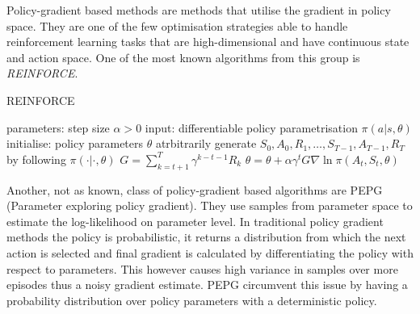 Policy-gradient based methods are methods that utilise the gradient in policy space. They are one  of the few optimisation strategies able to handle reinforcement learning tasks that are high-dimensional and have continuous state and action space. One of the most known algorithms from this group is \emph{REINFORCE}\cite{Sutton1998}.
\begin{algorithm}[h]
    \begin{algorithmic}[1]
    \caption{REINFORCE}
    \label{alg:reinforce}
        \State parameters: step size $\alpha>0$ 
        \State input: differentiable policy parametrisation $\pi(a|s,\theta)$
        \State initialise: policy parameters $\theta$ atrbitrarily
            \State generate $S_0, A_0, R_1,\dots,S_{T-1},A_{T-1},R_T$ by following $\pi(\cdot|\cdot,\theta)$
                \State $G = \sum_{k=t+1}^T\gamma^{k-t-1}R_k$
                \State $\theta = \theta + \alpha \gamma^t G \nabla\ln\pi(A_t,S_t,\theta)$
            \EndFor
        \EndFor
    \end{algorithmic}
\end{algorithm}


Another, not as known, class of policy-gradient based algorithms are PEPG (Parameter exploring policy gradient).\cite{Sehnke2012} They use samples from parameter space to estimate the log-likelihood on parameter level. In traditional policy gradient methods the policy is probabilistic, it returns a distribution from which the next action is selected and final gradient is calculated by differentiating the policy with respect to parameters. This however causes high variance in samples over more episodes thus a noisy gradient estimate. PEPG circumvent this issue by having a probability distribution over policy parameters with a deterministic policy.


